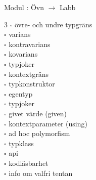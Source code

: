 
    Modul : Övn  $\rightarrow$ Labb 
    \begin{multicols}{3}\SlideFontTiny
    $\square$ övre- och undre typgräns \\
$\square$ varians \\
$\square$ kontravarians \\
$\square$ kovarians \\
$\square$ typjoker \\
$\square$ kontextgräns \\
$\square$ typkonstruktor \\
$\square$ egentyp \\
$\square$ typjoker \\
$\square$ givet värde (given) \\
$\square$ kontextparameter (using) \\
$\square$ ad hoc polymorfism \\
$\square$ typklass \\
$\square$ api \\
$\square$ kodläsbarhet \\
$\square$ info om valfri tentan \\
    \end{multicols}
    